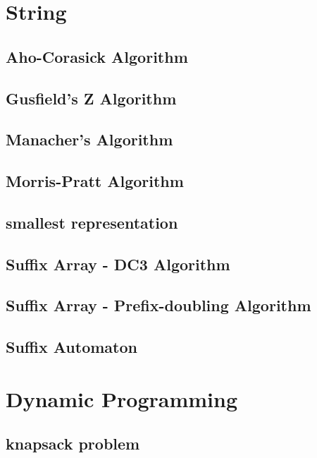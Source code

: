 \documentclass[a4paper,5pt,twocolumn,titlepage]{article}
\begin{document}
\section{String}
\subsection{Aho-Corasick Algorithm}

\subsection{Gusfield's Z Algorithm}

\subsection{Manacher's Algorithm}

\subsection{Morris-Pratt Algorithm}

\subsection{smallest representation}

\subsection{Suffix Array - DC3 Algorithm}

\subsection{Suffix Array - Prefix-doubling Algorithm}

\subsection{Suffix Automaton}


\section{Dynamic Programming}
\subsection{knapsack problem}

\end{document}
